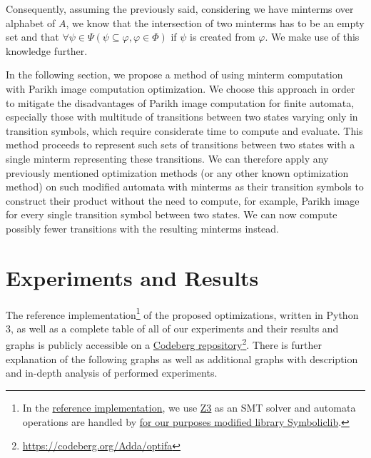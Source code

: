 Consequently, assuming the previously said, considering we have minterms over alphabet of $A$, we know that the intersection of two minterms has to be an empty set and that $\forall \psi \in \Psi ( \psi \subseteq \varphi, \varphi \in \Phi )$ if $\psi$ is created from $\varphi$. We make use of this knowledge further.

In the following section, we propose a method of using minterm computation with Parikh image computation optimization. We choose this approach in order to mitigate the disadvantages of Parikh image computation for finite automata, especially those with multitude of transitions between two states varying only in transition symbols, which require considerate time to compute and evaluate. This method proceeds to represent such sets of transitions between two states with a single minterm representing these transitions. We can therefore apply any previously mentioned optimization methods (or any other known optimization method) on such modified automata with minterms as their transition symbols to construct their product without the need to compute, for example, Parikh image for every single transition symbol between two states. We can now compute possibly fewer transitions with the resulting minterms instead.



\chapter{Experiments and Results}\label{experimentsAndResultsChapter}

The reference implementation\footnote{In the \href{https://codeberg.org/Adda/optifa}{reference implementation}, we use \href{https://github.com/Z3Prover/z3}{Z3} as an SMT solver and automata operations are handled by \href{https://codeberg.org/Adda/symboliclib}{for our purposes modified library Symboliclib}.} of the proposed optimizations, written in Python 3, as well as a complete table of all of our experiments and their results and graphs is publicly accessible on a \href{https://codeberg.org/Adda/optifa}{Codeberg repository}\footnote{{\href{https://codeberg.org/Adda/optifa}{https://codeberg.org/Adda/optifa}}}. There is further explanation of the following graphs as well as additional graphs with description and in-depth analysis of performed experiments.

